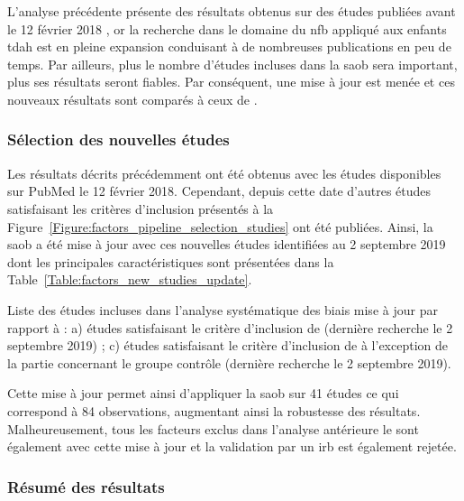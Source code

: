 L'analyse précédente présente des résultats obtenus sur des études publiées avant le 12 février 2018 \citep{Bussalb2019clinical}, or la recherche dans le domaine 
du \gls{nfb} appliqué aux enfants \gls{tdah} est en pleine expansion conduisant à de nombreuses publications en peu de temps. 
Par ailleurs, plus le nombre d'études incluses dans la \gls{saob} sera important, plus ses résultats seront fiables. Par conséquent, une mise à jour 
est menée et ces nouveaux résultats sont comparés à ceux de \citet{Bussalb2019clinical}.

\subsubsection{Sélection des nouvelles études} 

Les résultats décrits précédemment ont été obtenus avec les études disponibles sur PubMed le 12 février 2018. Cependant, depuis cette date d'autres études satisfaisant
les critères d'inclusion présentés à la Figure~\ref{Figure:factors_pipeline_selection_studies} ont été publiées. Ainsi, la \gls{saob} a été mise à jour avec ces 
nouvelles études identifiées au 2 septembre 2019 dont les principales caractéristiques sont présentées dans la Table~\ref{Table:factors_new_studies_update}.

\begin{table}[h!]
  \centering
  \caption{Liste des études incluses dans l'analyse systématique des biais mise à jour par rapport à \citep{Bussalb2019clinical}: a) études satisfaisant le critère d'inclusion de \citet{Cortese2016} (dernière recherche 
	le 2 septembre 2019) ; c) études satisfaisant le critère d'inclusion de \citet{Cortese2016} à l'exception de la partie concernant le groupe contrôle 
	(dernière recherche le 2 septembre 2019).}
  
  \label{Table:factors_new_studies_update}
\end{table}

Cette mise à jour permet ainsi d'appliquer la \gls{saob} sur 41 études ce qui correspond à 84 observations, augmentant ainsi la robustesse des
résultats. Malheureusement, tous les facteurs exclus dans l'analyse antérieure le sont également avec cette mise à jour et la validation par
un \gls{irb} est également rejetée.

\subsubsection{Résumé des résultats} 

